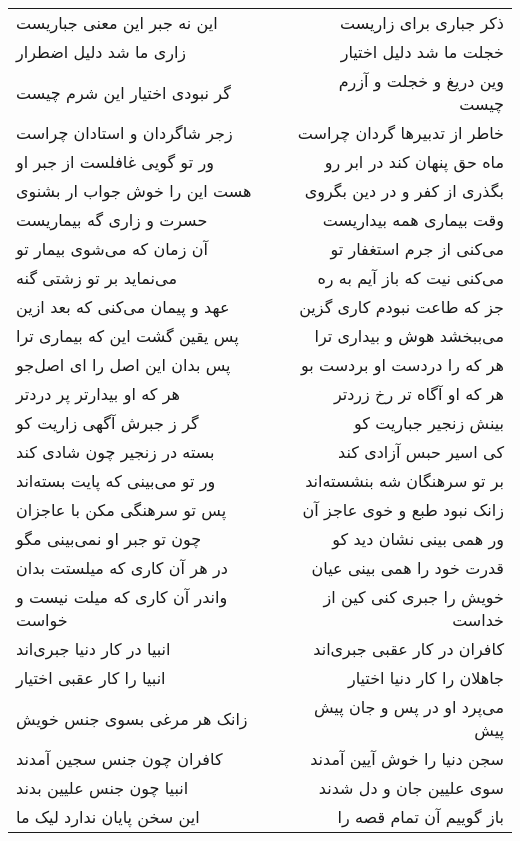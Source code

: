 \begin{center}
\begin{longtable}{l p{0.5cm} r}
این نه جبر این معنی جباریست
&&
ذکر جباری برای زاریست
\\
زاری ما شد دلیل اضطرار
&&
خجلت ما شد دلیل اختیار
\\
گر نبودی اختیار این شرم چیست
&&
وین دریغ و خجلت و آزرم چیست
\\
زجر شاگردان و استادان چراست
&&
خاطر از تدبیرها گردان چراست
\\
ور تو گویی غافلست از جبر او
&&
ماه حق پنهان کند در ابر رو
\\
هست این را خوش جواب ار بشنوی
&&
بگذری از کفر و در دین بگروی
\\
حسرت و زاری گه بیماریست
&&
وقت بیماری همه بیداریست
\\
آن زمان که می‌شوی بیمار تو
&&
می‌کنی از جرم استغفار تو
\\
می‌نماید بر تو زشتی گنه
&&
می‌کنی نیت که باز آیم به ره
\\
عهد و پیمان می‌کنی که بعد ازین
&&
جز که طاعت نبودم کاری گزین
\\
پس یقین گشت این که بیماری ترا
&&
می‌ببخشد هوش و بیداری ترا
\\
پس بدان این اصل را ای اصل‌جو
&&
هر که را دردست او بردست بو
\\
هر که او بیدارتر پر دردتر
&&
هر که او آگاه تر رخ زردتر
\\
گر ز جبرش آگهی زاریت کو
&&
بینش زنجیر جباریت کو
\\
بسته در زنجیر چون شادی کند
&&
کی اسیر حبس آزادی کند
\\
ور تو می‌بینی که پایت بسته‌اند
&&
بر تو سرهنگان شه بنشسته‌اند
\\
پس تو سرهنگی مکن با عاجزان
&&
زانک نبود طبع و خوی عاجز آن
\\
چون تو جبر او نمی‌بینی مگو
&&
ور همی بینی نشان دید کو
\\
در هر آن کاری که میلستت بدان
&&
قدرت خود را همی بینی عیان
\\
واندر آن کاری که میلت نیست و خواست
&&
خویش را جبری کنی کین از خداست
\\
انبیا در کار دنیا جبری‌اند
&&
کافران در کار عقبی جبری‌اند
\\
انبیا را کار عقبی اختیار
&&
جاهلان را کار دنیا اختیار
\\
زانک هر مرغی بسوی جنس خویش
&&
می‌پرد او در پس و جان پیش پیش
\\
کافران چون جنس سجین آمدند
&&
سجن دنیا را خوش آیین آمدند
\\
انبیا چون جنس علیین بدند
&&
سوی علیین جان و دل شدند
\\
این سخن پایان ندارد لیک ما
&&
باز گوییم آن تمام قصه را
\\
\end{longtable}
\end{center}
